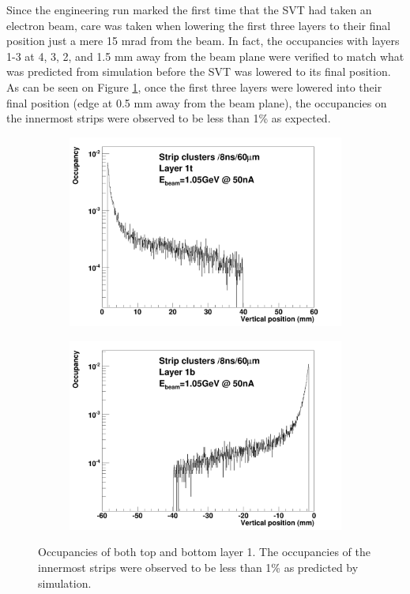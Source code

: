 Since the engineering run marked the first time that the SVT had taken an 
electron beam, care was taken when lowering the first three layers to their 
final position just a mere 15 mrad from the beam.  In fact, the occupancies 
with layers 1-3 at 4, 3, 2, and 1.5 mm away from the beam plane were verified to
match what was predicted from simulation before the SVT was lowered to its final
position.  As can be seen on Figure \ref{fig:occupancies}, once the first
three layers were lowered into their final position (edge at 0.5 mm away from the
beam plane), the occupancies on the innermost strips were observed to be less
than 1\% as expected.
\begin{figure}[h!b]
    \begin{subfigure}{.5\textwidth}
        \centering
        \includegraphics[width=\textwidth]{images/cluster_occupancy_L1t_axial.png}
    \end{subfigure}
    \begin{subfigure}{.5\textwidth}
        \centering
        \includegraphics[width=\textwidth]{images/cluster_occupancy_L1b_axial.png}
    \end{subfigure}
    \caption{Occupancies of both top and bottom layer 1.  The occupancies of 
             the innermost strips were observed to be less than 1\% as predicted
             by simulation.}
    \label{fig:occupancies}
\end{figure}  

